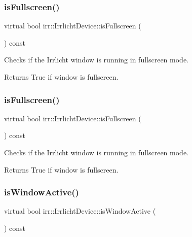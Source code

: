 \subsubsection{\texorpdfstring{is\+Fullscreen()}{isFullscreen()}\hspace{0.1cm}{\footnotesize\ttfamily [2/3]}}
{\footnotesize\ttfamily virtual bool irr\+::\+Irrlicht\+Device\+::is\+Fullscreen (\begin{DoxyParamCaption}{ }\end{DoxyParamCaption}) const\hspace{0.3cm}{\ttfamily [pure virtual]}}



Checks if the Irrlicht window is running in fullscreen mode. 

\begin{DoxyReturn}{Returns}
True if window is fullscreen. 
\end{DoxyReturn}
\mbox{\label{classirr_1_1IrrlichtDevice_a409df5e9b9b90635bd3c2db31978a5c1}} 
\subsubsection{\texorpdfstring{is\+Fullscreen()}{isFullscreen()}\hspace{0.1cm}{\footnotesize\ttfamily [3/3]}}
{\footnotesize\ttfamily virtual bool irr\+::\+Irrlicht\+Device\+::is\+Fullscreen (\begin{DoxyParamCaption}{ }\end{DoxyParamCaption}) const\hspace{0.3cm}{\ttfamily [pure virtual]}}



Checks if the Irrlicht window is running in fullscreen mode. 

\begin{DoxyReturn}{Returns}
True if window is fullscreen. 
\end{DoxyReturn}
\mbox{\label{classirr_1_1IrrlichtDevice_abd3c88336b739da2694883d5ffd25a70}} 
\subsubsection{\texorpdfstring{is\+Window\+Active()}{isWindowActive()}\hspace{0.1cm}{\footnotesize\ttfamily [1/3]}}
{\footnotesize\ttfamily virtual bool irr\+::\+Irrlicht\+Device\+::is\+Window\+Active (\begin{DoxyParamCaption}{ }\end{DoxyParamCaption}) const\hspace{0.3cm}{\ttfamily [pure virtual]}}



